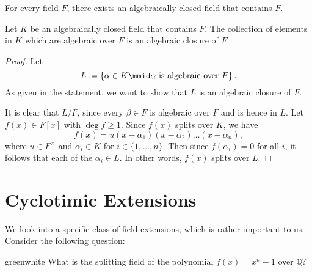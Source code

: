 \documentclass[notoc,notitlepage]{tufte-book}
\begin{document}
\begin{thm}\label{thm:every_field_has_an_algebraic_closure}
  For every field $F$, there exists an algebraically closed field that contains $F$.
\end{thm}

\begin{thm}\label{thm:smallest_algebraic_closure}
  Let $K$ be an algebraically closed field that contains $F$. The collection of elements
  in $K$ which are algebraic over $F$ is an algebraic closure of $F$.
\end{thm}

\begin{proof}
  Let
  \begin{equation*}
    L := \left\{ \alpha \in K \mmid \alpha \text{ is algebraic over } F \right\}.
  \end{equation*}
  As given in the statement, we want to show that $L$ is an algebraic closure of $F$.

  It is clear that $L / F$, since every $\beta \in F$ is algebraic over $F$ and is hence
  in $L$. Let $f(x) \in F[x]$ with $\deg f \geq 1$. Since $f(x)$ splits over $K$, we have
  \begin{equation*}
    f(x) = u(x - \alpha_1)(x - \alpha_2) \hdots (x - \alpha_n),
  \end{equation*}
  where $u \in F^\times$ and $\alpha_i \in K$ for $i \in \{ 1, \ldots, n \}$. Then since
  $f(\alpha_i) = 0$ for all $i$, it follows that each of the $\alpha_i \in L$. In other
  words, $f(x)$ splits over $L$.
\end{proof}


\section{Cyclotimic Extensions}%
\label{sec:cyclotimic_extensions}

We look into a specific class of field extensions, which is rather important to us.
Consider the following question:

\begin{quotebox}{green}{white}
  What is the splitting field of the polynomial $f(x) = x^n - 1$ over $\mathbb{Q}$?
\end{quotebox}
\end{document}
